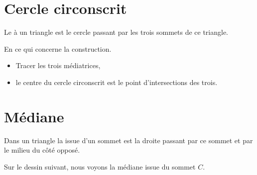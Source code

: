 \section{Cercle circonscrit}

\begin{definition}
    Le  à un triangle est le cercle passant par les trois sommets de ce triangle.
\end{definition}


\begin{center}
   
\end{center}

En ce qui concerne la construction.

\begin{center}
   
\end{center}

\begin{itemize}
    \item Tracer les trois médiatrices,
    \item le centre du cercle circonscrit est le point d'intersections des trois.
\end{itemize}

\section{Médiane}

\begin{definition}
    Dans un triangle la  issue d'un sommet est la droite passant par ce sommet et par le milieu du côté opposé.
\end{definition}

Sur le dessin suivant, nous voyons la médiane issue du sommet \( C\).
\begin{center}
   
\end{center}

